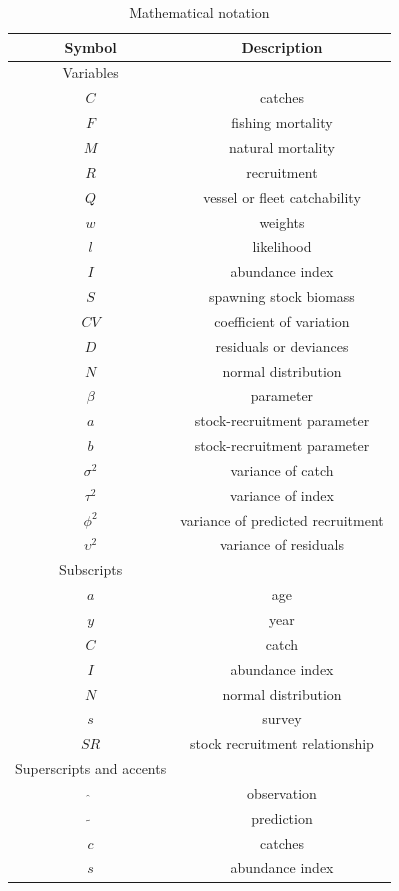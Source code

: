 \documentclass[a4paper,english,11pt]{article}
\begin{document}
\begin{table}
  \caption{Mathematical notation}
  \label{tab:mathsnotation}

  \begin{center}
    \begin{tabular}{cc}
      \hline
      Symbol & Description \\
      \hline
      \hline
       Variables & \\
       $C$ & catches \\
       $F$ & fishing mortality \\
       $M$ & natural mortality \\
       $R$ & recruitment \\
       $Q$ & vessel or fleet catchability \\
       $w$ & weights \\
       $l$ & likelihood \\
       $I$ & abundance index \\
       $S$ & spawning stock biomass \\
       $CV$ & coefficient of variation \\
       $D$ & residuals or deviances \\
       $N$ & normal distribution \\
       $\beta$ & parameter \\
       $a$ & stock-recruitment parameter \\
       $b$ & stock-recruitment parameter \\
       $\sigma^2$ & variance of catch \\
       $\tau^2$ & variance of index \\
       $\phi^2$ & variance of predicted recruitment \\
       $\upsilon^2$ & variance of residuals \\
       Subscripts & \\
       $a$ & age \\
       $y$ & year \\
       $C$ & catch \\
       $I$ & abundance index \\
       $N$ & normal distribution \\
       $s$ & survey \\
       $SR$ & stock recruitment relationship \\
       Superscripts and accents & \\
       $\hat{}$ & observation \\
       $\tilde{}$ & prediction \\
       $c$ & catches \\
       $s$ & abundance index \\
      \hline
    \end{tabular}
  \end{center}
\end{table}
\end{document}
